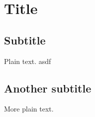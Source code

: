 \documentclass{article}
\begin{document}
\section{Title}

\subsection{Subtitle}

Plain text. asdf

\subsection{Another subtitle}

More plain text.
\end{document}
